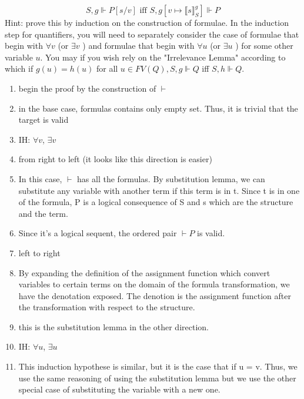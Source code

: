 \documentclass[10pt]{article}
\begin{document}
$$
S, g \Vdash P[s / v] \text { iff } S, g\left[v \mapsto \llbracket s \rrbracket_{S}^{g}\right] \Vdash P
$$
Hint: prove this by induction on the construction of formulae. In the induction step for quantifiers, you will need to separately consider the case of formulae that begin with $\forall v$ (or $\exists v$ ) and formulae that begin with $\forall u$ (or $\exists u$ ) for some other variable $u$. You may if you wish rely on the "Irrelevance Lemma" according to which if $g(u)=h(u)$ for all $u \in F V(Q), S, g \Vdash Q$ iff $S, h \Vdash Q$.
\begin{enumerate}
  \item begin the proof by the construction of $\vdash$
  \item in the base case, formulas contains only empty set. Thus, it is trivial that the target is valid
  \item IH: $\forall v$, $\exists v$
  \item from right to left (it looks like this direction is easier)
  \item In this case, $\vdash$ has all the formulas. By substitution lemma, we can substitute any variable with another term if this term is in t. Since t is in one of the formula, P is a logical consequence of S and s which are the structure and the term.
  \item Since it's a logical sequent, the ordered pair $\vdash P$ is valid.
  \item left to right
  \item By expanding the definition of the assignment function which convert variables to certain terms on the domain of the formula transformation, we have the denotation exposed. The denotion is the assignment function after the transformation with respect to the structure.
  \item this is the substitution lemma in the other direction.
    \item IH: $\forall u$, $\exists u$ 
    \item This induction hypothese is similar, but it is the case that if u = v. Thus, we use the same reasoning of using the substitution lemma but we use the other special case of substituting the variable with a new one.  
\end{enumerate}
\end{document}
